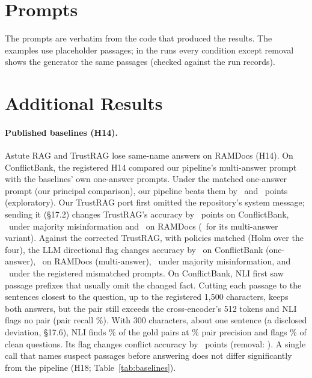 \section{Prompts}
\label{app:prompts}
The prompts are verbatim from the code that produced the results. The examples use placeholder passages; in the runs every condition except removal shows the generator the same passages (checked against the run records).


\section{Additional Results}
\label{app:extra}

\paragraph{Published baselines (H14).} Astute RAG \citep{wang2025astute} and TrustRAG \citep{zhou2025trustrag} lose same-name answers
on RAMDocs (H14). On ConflictBank, the registered H14 compared our pipeline's multi-answer prompt with the
baselines' own one-answer prompts. Under the matched one-answer prompt (our principal comparison), our pipeline beats them by
\hFourteenMatchedAst\ and \hFourteenMatchedTr\ points (exploratory). Our TrustRAG port
first omitted the repository's system message; sending it (\S17.2) changes TrustRAG's accuracy by \blTrustSysCb\
points on ConflictBank, \blTrustSysMj\ under majority misinformation and \blTrustSysRd\ on RAMDocs (\blTrustSysRdMulti\
for its multi-answer variant). Against the corrected TrustRAG, with policies matched (Holm over the four), the LLM
directional flag changes accuracy by \blHFourteenCbs\ on ConflictBank (one-answer), \blHFourteenRd\ on RAMDocs (multi-answer),
\blHFourteenMj\ under majority misinformation, and \blHFourteenCb\ under the registered mismatched prompts.
On ConflictBank, NLI first saw passage prefixes that usually omit the changed fact. Cutting each passage to the
sentences closest to the question, up to the registered 1,500 characters, keeps both answers, but the
pair still exceeds the cross-encoder's 512 tokens and NLI flags no pair (pair recall \detNliWinRecall\%). With
300 characters, about one sentence (a disclosed deviation, \S17.6), NLI finds \detNliSentRecall\% of the gold pairs at
\detNliSentPrec\% pair precision and flags \detNliSentCleanFpr\% of clean questions. Its flag changes conflict
accuracy by \blNliSentFlag\ points (removal: \blNliSentRem). A single call that names suspect passages before
answering does not differ significantly from the pipeline (H18; Table~\ref{tab:baselines}).

